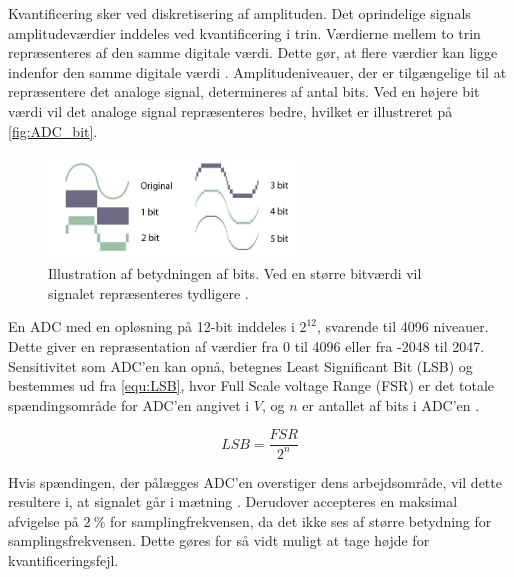 Kvantificering sker ved diskretisering af amplituden. Det oprindelige signals amplitudeværdier inddeles ved kvantificering i trin. Værdierne mellem to trin repræsenteres af den samme digitale værdi. Dette gør, at flere værdier kan ligge indenfor den samme digitale værdi \citep{morre2003}. Amplitudeniveauer, der er tilgængelige til at repræsentere det analoge signal, determineres af antal bits. Ved en højere bit værdi vil det analoge signal repræsenteres bedre, hvilket er illustreret på \autoref{fig:ADC_bit}.

\begin{figure}[H]
\centering
\includegraphics[width=0.6\textwidth]{figures/problemloesning/ADC_bit}
\caption{Illustration af betydningen af bits. Ved en større bitværdi vil signalet repræsenteres tydligere \citep{adc2010}.}
\label{fig:ADC_bit}
\end{figure}

\noindent
En ADC med en opløsning på 12-bit inddeles i ${2}^{12}$, svarende til 4096 niveauer. Dette giver en repræsentation af værdier fra 0 til 4096 eller fra -2048 til 2047. Sensitivitet som ADC'en kan opnå, betegnes Least Significant Bit (LSB) og bestemmes ud fra \autoref{equ:LSB}, hvor Full Scale voltage Range (FSR) er det totale spændingsområde for ADC'en angivet i $V$, og $n$ er antallet af bits i ADC'en \citep{webster1998, wolf2004}.

\begin{equation} \label{equ:LSB}
LSB=\dfrac{FSR}{2^{n}}
\end{equation}

\noindent
Hvis spændingen, der pålægges ADC'en overstiger dens arbejdsområde, vil dette resultere i, at signalet går i mætning \citep{webster1998, wolf2004}. 
Derudover accepteres en maksimal afvigelse på $2~\%$ for samplingfrekvensen, da det ikke ses af større betydning for samplingsfrekvensen. Dette gøres for så vidt muligt at tage højde for kvantificeringsfejl. 

